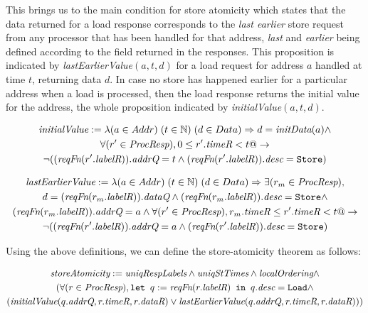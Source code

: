 This brings us to the main condition for store atomicity which states that the
data returned for a load response corresponds to the \emph{last earlier} store
request from any processor that has been handled for that address,
\emph{last} and \emph{earlier} being defined according to the field \timeR{}
returned in the responses.  This proposition is indicated by
\textit{lastEarlierValue}$(a, t, d)$ for a load request for address $a$ handled
at time $t$, returning data $d$.  In case no store has happened earlier for a
particular address when a load is processed, then the load response returns the
initial value for the address, the whole proposition indicated by
\textit{initialValue}$(a, t, d)$.
\begin{defn}
\small
\begin{multline*}
\textit{initialValue} := \lambda (a \in Addr)\; (t \in \mathbb{N}) \; (d \in Data)\Rightarrow
d = \textit{initData} (a) \wedge \\
\forall (r' \in \textit{ProcResp}), 0 \le r'.\textit{timeR} < t @->\\
\neg ((\textit{reqFn} (r'.\textit{labelR})).\textit{addrQ} = t \wedge (\textit{reqFn} (r'.\textit{labelR})).\textit{desc} = \texttt{Store})
\end{multline*}
\label{initialValue}
\end{defn}

\begin{defn}
\small
\begin{multline*}
\textit{lastEarlierValue} := \lambda (a \in Addr)\; (t \in \mathbb{N}) \; (d \in Data)\Rightarrow
\exists (r_m \in \textit{ProcResp}),\\ d = (\textit{reqFn} (r_m.\textit{labelR})).\textit{dataQ} \wedge 
(\textit{reqFn} (r_m.\textit{labelR})).\textit{desc} = \texttt{Store} \wedge\\ (\textit{reqFn} (r_m.\textit{labelR})).\textit{addrQ} = a \wedge
\forall (r' \in \textit{ProcResp}), r_m.\textit{timeR} \le r'.\textit{timeR} < t @->\\
\neg ((\textit{reqFn} (r'.\textit{labelR})).\textit{addrQ} = a \wedge (\textit{reqFn} (r'.\textit{labelR})).\textit{desc} = \texttt{Store})
\end{multline*}
\label{lastEarlierValue}
\end{defn}

Using the above definitions, we can define the store-atomicity theorem as follows:
\begin{thm}
\small
\begin{multline*}
\textit{storeAtomicity} := 
\textit{uniqRespLabels} \wedge
\textit{uniqStTimes} \wedge \textit{localOrdering} \wedge \\
(\forall (r \in \textit{ProcResp}), \texttt{let } q := \textit{reqFn}(r.\textit{labelR}) \texttt{ in } q.\textit{desc} = \texttt{Load} \wedge \\
(\textit{initialValue}(q.\textit{addrQ}, r.\textit{timeR}, r.\textit{dataR}) \vee \textit{lastEarlierValue}(q.\textit{addrQ}, r.\textit{timeR}, r.\textit{dataR})))
\end{multline*}
\label{storeAtomicity}
\end{thm}
